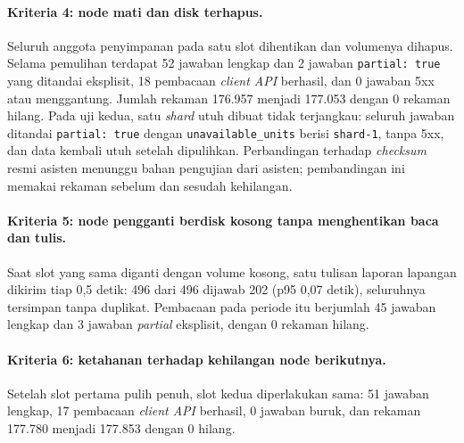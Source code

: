\paragraph*{Kriteria 4: node mati dan disk terhapus.}
Seluruh anggota penyimpanan pada satu slot dihentikan dan volumenya dihapus. Selama pemulihan terdapat 52 jawaban lengkap dan 2 jawaban \texttt{partial: true} yang ditandai eksplisit, 18 pembacaan \textit{client API} berhasil, dan 0 jawaban 5xx atau menggantung. Jumlah rekaman 176.957 menjadi 177.053 dengan 0 rekaman hilang. Pada uji kedua, satu \textit{shard} utuh dibuat tidak terjangkau: seluruh jawaban ditandai \texttt{partial: true} dengan \texttt{unavailable\_units} berisi \texttt{shard-1}, tanpa 5xx, dan data kembali utuh setelah dipulihkan. Perbandingan terhadap \textit{checksum} resmi asisten menunggu bahan pengujian dari asisten; pembandingan ini memakai rekaman sebelum dan sesudah kehilangan.

\paragraph*{Kriteria 5: node pengganti berdisk kosong tanpa menghentikan baca dan tulis.}
Saat slot yang sama diganti dengan volume kosong, satu tulisan laporan lapangan dikirim tiap 0,5 detik: 496 dari 496 dijawab 202 (p95 0,07 detik), seluruhnya tersimpan tanpa duplikat. Pembacaan pada periode itu berjumlah 45 jawaban lengkap dan 3 jawaban \textit{partial} eksplisit, dengan 0 rekaman hilang.

\paragraph*{Kriteria 6: ketahanan terhadap kehilangan node berikutnya.}
Setelah slot pertama pulih penuh, slot kedua diperlakukan sama: 51 jawaban lengkap, 17 pembacaan \textit{client API} berhasil, 0 jawaban buruk, dan rekaman 177.780 menjadi 177.853 dengan 0 hilang.

